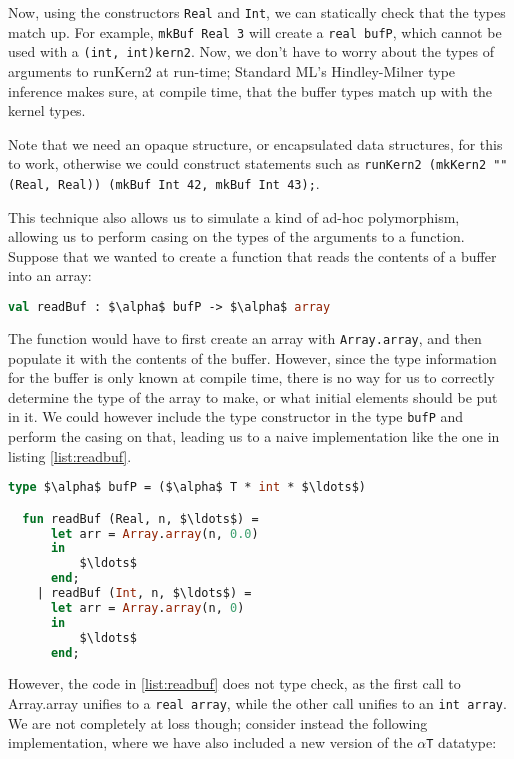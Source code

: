 Now, using the constructors \texttt{Real} and \texttt{Int}, we can
statically check that the types match up. For example, \texttt{mkBuf
  Real 3} will create a \texttt{real bufP}, which cannot be used with
a \texttt{(int, int)kern2}. Now, we don't have to worry about the
types of arguments to runKern2 at run-time; Standard ML's
Hindley-Milner type inference makes sure, at compile time, that the
buffer types match up with the kernel types.

Note that we need an opaque structure, or encapsulated data
structures, for this to work, otherwise we could construct statements
such as \texttt{runKern2 (mkKern2 "" (Real, Real)) (mkBuf Int 42,
  mkBuf Int 43);}.

This technique also allows us to simulate a kind of ad-hoc
polymorphism, allowing us to perform casing on the types of the
arguments to a function. Suppose that we wanted to create a function
that reads the contents of a buffer into an array:

\begin{lstlisting}[language=ML, caption=readBuf signature, mathescape]
  val readBuf : $\alpha$ bufP -> $\alpha$ array
\end{lstlisting}

The function would have to first create an array with
\texttt{Array.array}, and then populate it with the contents of the
buffer. However, since the type information for the buffer is only
known at compile time, there is no way for us to correctly determine
the type of the array to make, or what initial elements should be put
in it. We could however include the type constructor in the type
\texttt{bufP} and perform the casing on that, leading us to a naive
implementation like the one in listing \ref{list:readbuf}.

\begin{lstlisting}[language=ML, caption=Initial implementation of
    readBuf.,mathescape,label=list:readbuf]
  type $\alpha$ bufP = ($\alpha$ T * int * $\ldots$)

  fun readBuf (Real, n, $\ldots$) =
      let arr = Array.array(n, 0.0)
      in
          $\ldots$
      end;
    | readBuf (Int, n, $\ldots$) =
      let arr = Array.array(n, 0)
      in
          $\ldots$
      end;
\end{lstlisting}

However, the code in \ref{list:readbuf} does not type check, as the
first call to Array.array unifies to a \texttt{real array}, while the
other call unifies to an \texttt{int array}. We are not completely at
loss though; consider instead the following implementation, where
we have also included a new version of the \texttt{$\alpha$T} datatype:

